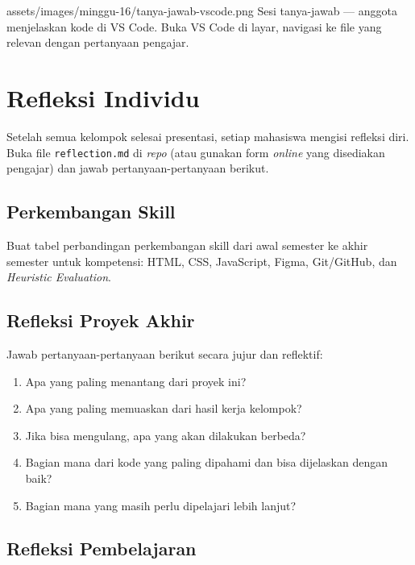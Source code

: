 \begin{tangkapanlayar}
  {assets/images/minggu-16/tanya-jawab-vscode.png}
  {Sesi tanya-jawab --- anggota menjelaskan kode di VS Code.}
  {Buka VS Code di layar, navigasi ke file yang relevan dengan pertanyaan pengajar.}
\end{tangkapanlayar}

\section{Refleksi Individu}
\label{sec:refleksi}

Setelah semua kelompok selesai presentasi, setiap mahasiswa mengisi refleksi diri. Buka file \texttt{reflection.md} di \emph{repo} (atau gunakan form \emph{online} yang disediakan pengajar) dan jawab pertanyaan-pertanyaan berikut.

\subsection{Perkembangan Skill}
\label{subsec:perkembangan-skill}

Buat tabel perbandingan perkembangan skill dari awal semester ke akhir semester untuk kompetensi: HTML, CSS, JavaScript, Figma, Git/GitHub, dan \emph{Heuristic Evaluation}.

\subsection{Refleksi Proyek Akhir}
\label{subsec:refleksi-proyek}

Jawab pertanyaan-pertanyaan berikut secara jujur dan reflektif:
\begin{enumerate}
  \item Apa yang paling menantang dari proyek ini?
  \item Apa yang paling memuaskan dari hasil kerja kelompok?
  \item Jika bisa mengulang, apa yang akan dilakukan berbeda?
  \item Bagian mana dari kode yang paling dipahami dan bisa dijelaskan dengan baik?
  \item Bagian mana yang masih perlu dipelajari lebih lanjut?
\end{enumerate}

\subsection{Refleksi Pembelajaran}
\label{subsec:refleksi-pembelajaran}

